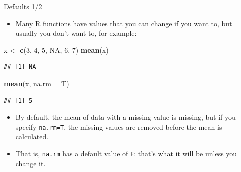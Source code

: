 \documentclass[
  ignorenonframetext,
]{beamer}
\newenvironment{Shaded}{\begin{snugshade}}{\end{snugshade}}
\newcommand{\DataTypeTok}[1]{\textcolor[rgb]{0.13,0.29,0.53}{#1}}
\newcommand{\DecValTok}[1]{\textcolor[rgb]{0.00,0.00,0.81}{#1}}
\newcommand{\KeywordTok}[1]{\textcolor[rgb]{0.13,0.29,0.53}{\textbf{#1}}}
\newcommand{\NormalTok}[1]{#1}
\newcommand{\OtherTok}[1]{\textcolor[rgb]{0.56,0.35,0.01}{#1}}
\newcommand{\StringTok}[1]{\textcolor[rgb]{0.31,0.60,0.02}{#1}}
\providecommand{\tightlist}{%
  \setlength{\itemsep}{0pt}\setlength{\parskip}{0pt}}
\begin{document}
\begin{frame}[fragile]{Defaults 1/2}
\protect\hypertarget{defaults-12}{}

\begin{itemize}
\tightlist
\item
  Many R functions have values that you can change if you want to, but
  usually you don't want to, for example:
\end{itemize}

\begin{Shaded}
\begin{Highlighting}[]
\NormalTok{x <-}\StringTok{ }\KeywordTok{c}\NormalTok{(}\DecValTok{3}\NormalTok{, }\DecValTok{4}\NormalTok{, }\DecValTok{5}\NormalTok{, }\OtherTok{NA}\NormalTok{, }\DecValTok{6}\NormalTok{, }\DecValTok{7}\NormalTok{)}
\KeywordTok{mean}\NormalTok{(x)}
\end{Highlighting}
\end{Shaded}

\begin{verbatim}
## [1] NA
\end{verbatim}

\begin{Shaded}
\begin{Highlighting}[]
\KeywordTok{mean}\NormalTok{(x, }\DataTypeTok{na.rm =}\NormalTok{ T)}
\end{Highlighting}
\end{Shaded}

\begin{verbatim}
## [1] 5
\end{verbatim}

\begin{itemize}
\item
  By default, the mean of data with a missing value is missing, but if
  you specify \texttt{na.rm=T}, the missing values are removed before
  the mean is calculated.
\item
  That is, \texttt{na.rm} has a default value of \texttt{F}: that's what
  it will be unless you change it.
\end{itemize}

\end{frame}
\end{document}
